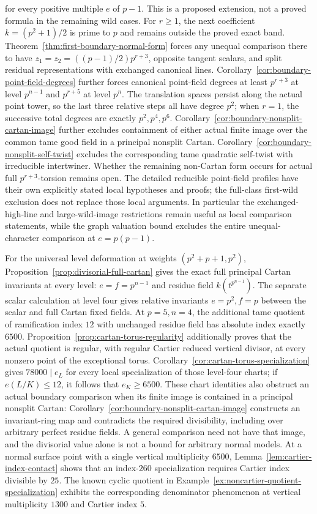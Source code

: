 for every positive multiple $e$ of $p-1$. This is a proposed extension, not a proved formula in the remaining wild cases. For $r\ge1$, the next coefficient $k=(p^2+1)/2$ is prime to $p$ and remains outside the proved exact band. Theorem~\ref{thm:first-boundary-normal-form} forces any unequal comparison there to have $z_1=z_2=((p-1)/2)p^{r+3}$, opposite tangent scalars, and split residual representations with exchanged canonical lines. Corollary~\ref{cor:boundary-point-field-degrees} further forces canonical point-field degrees at least $p^{r+3}$ at level $p^{n-1}$ and $p^{r+5}$ at level $p^n$. The translation spaces persist along the actual point tower, so the last three relative steps all have degree $p^2$; when $r=1$, the successive total degrees are exactly $p^2,p^4,p^6$. Corollary~\ref{cor:boundary-nonsplit-cartan-image} further excludes containment of either actual finite image over the common tame good field in a principal nonsplit Cartan. Corollary~\ref{cor:boundary-nonsplit-self-twist} excludes the corresponding tame quadratic self-twist with irreducible intertwiner. Whether the remaining non-Cartan form occurs for actual full $p^{r+3}$-torsion remains open. The detailed reducible point-field profiles have their own explicitly stated local hypotheses and proofs; the full-class first-wild exclusion does not replace those local arguments. In particular the exchanged-high-line and large-wild-image restrictions remain useful as local comparison statements, while the graph valuation bound excludes the entire unequal-character comparison at $e=p(p-1)$.

For the universal level deformation at weights $(p^2+p+1,p^2)$, Proposition~\ref{prop:divisorial-full-cartan} gives the exact full principal Cartan invariants at every level: $e=f=p^{n-1}$ and residue field $k(t^{p^{n-1}})$. The separate scalar calculation at level four gives relative invariants $e=p^2,f=p$ between the scalar and full Cartan fixed fields. At $p=5,n=4$, the additional tame quotient of ramification index $12$ with unchanged residue field has absolute index exactly $6500$. Proposition~\ref{prop:cartan-torus-regularity} additionally proves that the actual quotient is regular, with regular Cartier reduced vertical divisor, at every nonzero point of the exceptional torus. Corollary~\ref{cor:cartan-torus-specialization} gives $78000\mid e_L$ for every local specialization of those level-four charts; if $e(L/K)\le12$, it follows that $e_K\ge6500$. These chart identities also obstruct an actual boundary comparison when its finite image is contained in a principal nonsplit Cartan: Corollary~\ref{cor:boundary-nonsplit-cartan-image} constructs an invariant-ring map and contradicts the required divisibility, including over arbitrary perfect residue fields. A general comparison need not have that image, and the divisorial value alone is not a bound for arbitrary normal models. At a normal surface point with a single vertical multiplicity $6500$, Lemma~\ref{lem:cartier-index-contact} shows that an index-$260$ specialization requires Cartier index divisible by $25$. The known cyclic quotient in Example~\ref{ex:noncartier-quotient-specialization} exhibits the corresponding denominator phenomenon at vertical multiplicity $1300$ and Cartier index $5$.

